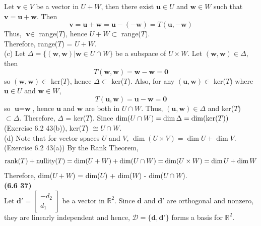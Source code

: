 Let $\textbf{v} \in V$ be a vector in $U + W$, then there exist $\textbf{u} \in U$ and $\textbf{w} \in W$ such that $\textbf{v} = \textbf{u} + \textbf{w}$. Then \begin{equation*}
	\textbf{v} = \textbf{u} + \textbf{w} = \textbf{u} - (-\textbf{w}) = T(\textbf{u}, -\textbf{w})
\end{equation*} Thus, $\textbf{v} \in$ range($T$), hence $U + W \subset$ range($T$). \\

Therefore, range($T$) = $U + W$. \\

(c) Let $\Delta = \{(\textbf{w}, \textbf{w}) \vert \textbf{w} \in U \cap W\}$ be a subspace of $U \times W$. Let $(\textbf{w}, \textbf{w}) \in \Delta$, then \begin{equation*}
	T(\textbf{w}, \textbf{w}) = \textbf{w} - \textbf{w} = \textbf{0}
\end{equation*} so $(\textbf{w}, \textbf{w}) \in$ ker($T$), hence $\Delta \subset$ ker($T$). Also, for any $(\textbf{u}, \textbf{w}) \in$ ker($T$) where $\textbf{u} \in U$ and $\textbf{w} \in W$, \begin{equation*}
	T(\textbf{u}, \textbf{w}) = \textbf{u} - \textbf{w} = \textbf{0}
\end{equation*} so $\textbf{u} = \textbf{w}$, hence $\textbf{u}$ and $\textbf{w}$ are both in $U \cap W$. Thus, $(\textbf{u}, \textbf{w}) \in \Delta$ and ker($T$) $\subset \Delta$. Therefore, $\Delta$ = ker($T$). Since $\dim(U \cap W) = \dim \Delta = \dim(\textnormal{ker}(T))$ (Exercise 6.2 43(b)), ker($T$) $\cong U \cap W$. \\

(d) Note that for vector spaces $U$ and $V$, $\dim(U \times V) = \dim U + \dim V$. (Exercise 6.2 43(a)) By the Rank Theorem, \begin{equation*}
	\textnormal{rank}(T) + \textnormal{nullity}(T) = \dim(U + W) + \dim(U \cap W) = \dim(U \times W) = \dim U + \dim W
\end{equation*} Therefore, dim($U + W$) = dim($U$) + dim($W$) - dim($U \cap W$). \\

\textbf{(6.6 37)} \\
Let $\textbf{d}' = \begin{bmatrix}
	-d_2 \\ d_1
\end{bmatrix}$ be a vector in $\mathbb{R}^2$. Since $\textbf{d}$ and $\textbf{d}'$ are orthogonal and nonzero, they are linearly independent and hence, $\mathcal{D} = \{\textbf{d}, \textbf{d}'\}$ forms a basis for $\mathbb{R}^2$. \\

